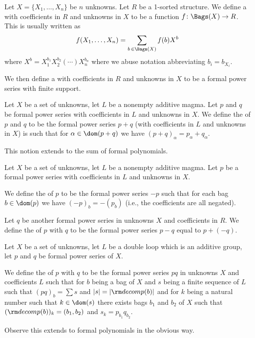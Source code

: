 \begin{definition}
Let $X = \{X_{1},\dots,X_{n}\}$ be $n$ unknowns.
Let $R$ be a 1-sorted structure.
We define a  with coefficients in $R$ and unknowns
in $X$ to be a function $f\colon\Bags(X)\to R$. This is usually
written as
\begin{equation}
f(X_{1},\dots,X_{n}) = \sum_{b\,\in\Bags(X)}f(b)X^{b}
\end{equation}
where $X^{b} = X_{1}^{b_{1}}X_{2}^{b_{2}}(\cdots)X_{n}^{b_{n}}$ where
we abuse notation abbreviating $b_{i}=b_{X_{i}}$.

We then define a  with coefficients in $R$
and unknowns in $X$ to be a formal power series with finite support.
\end{definition}

\begin{definition}
Let $X$ be a set of unknowns, let $L$ be a nonempty additive magma.
Let $p$ and $q$ be formal power series with coefficients in $L$ and
unknowns in $X$.
We define the  of $p$ and $q$ to be the formal power
series $p+q$ (with coefficients in $L$ and unknowns in $X$) is such
that %
for $\alpha\in\dom(p+q)$ we
have $(p+q)_{\alpha} = p_{\alpha} + q_{\alpha}$.

This notion extends to the sum of formal polynomials.
\end{definition}

\begin{definition}
Let $X$ be a set of unknowns, let $L$ be a nonempty additive magma.
Let $p$ be a formal power series with coefficients in $L$ and
unknowns in $X$.

We define the  of $p$ to be the formal power series $-p$ such that for each bag
$b\in\dom(p)$ we have $(-p)_{b}=-(p_{b})$ (i.e., the coefficients are
all negated).

Let $q$ be another formal power series in unknowns $X$ and
coefficients in $R$.
We define the  of $p$ with $q$ to be the formal
power series $p - q$ equal to $p + (-q)$.
\end{definition}

\begin{definition}
Let $X$ be a set of unknowns, let $L$ be a double loop which is an
additive group, let $p$ and $q$ be formal power series
of $X$.

We define the  of $p$ with $q$ to be the
formal power series $pq$ in unknowns $X$ and coefficients $L$ such
that for $b$ being a bag of $X$ and $s$ being a finite sequence of $L$
such that $(pq)_{b}=\sum s$ and $|s|=|{\rm decomp}(b)|$ and for $k$
being a natural number such that $k\in\dom(s)$ there exists bags
$b_{1}$ and $b_{2}$ of $X$ such that
$({\rm decomp}(b))_{k}=(b_{1},b_{2})$ and $s_{k}=p_{b_{1}}q_{b_{2}}$.

Observe this extends to formal polynomials in the obvious way.
\end{definition}

